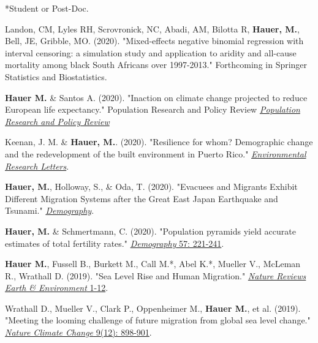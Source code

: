  *Student or Post-Doc.

 \begin{etaremune}

    \item Landon, CM, Lyles RH, Scrovronick, NC, Abadi, AM, Bilotta R, \textbf{Hauer, M.}, Bell, JE, Gribble, MO. (2020). "Mixed-effects negative binomial regression with interval censoring: a simulation study and application to aridity and all-cause mortality among black South Africans over 1997-2013." Forthcoming in Springer Statistics and Biostatistics. \\


    \item\textbf{Hauer M.} \& Santos A. (2020). "Inaction on climate change projected to reduce European life expectancy." Population Research and Policy Review \href{https://doi.org/10.1007/s11113-020-09584-w}{\textit{Population Research and Policy Review}}\\

     \item Keenan, J. M. \& \textbf{Hauer, M.}. (2020). "Resilience for whom? Demographic change and the
redevelopment of the built environment in Puerto Rico." \href{https://doi.org/10.1088/1748-9326/ab92c2}{\textit{Environmental Research Letters}}.

     \item \textbf{Hauer, M.}, Holloway, S., \& Oda, T. (2020). "Evacuees and Migrants Exhibit Different Migration Systems after the Great East Japan Earthquake and Tsunami." \href{https://link.springer.com/article/10.1007/s13524-020-00883-7}{\textit{Demography}}.\\

     \item \textbf{Hauer, M.} \& Schmertmann, C. (2020). "Population pyramids yield accurate estimates of total fertility rates." \href{https://link.springer.com/article/10.1007/s13524-019-00842-x}{\textit{Demography} 57: 221-241}.\\

     \item \textbf{Hauer M.}, Fussell B., Burkett M., Call M.*, Abel K.*, Mueller V., McLeman R., Wrathall D. (2019). "Sea Level Rise and Human Migration." \href{https://www.nature.com/articles/s43017-019-0002-9}{\textit{Nature Reviews Earth \& Environment} 1-12}.\\

    \item Wrathall D., Mueller V., Clark P., Oppenheimer M., \textbf{Hauer M.}, et al. (2019). "Meeting the looming challenge of future migration from global sea level change." \href{https://www.nature.com/articles/s41558-019-0640-4}{\textit{Nature Climate Change} 9(12): 898-901}. \\


\end{etaremune}

